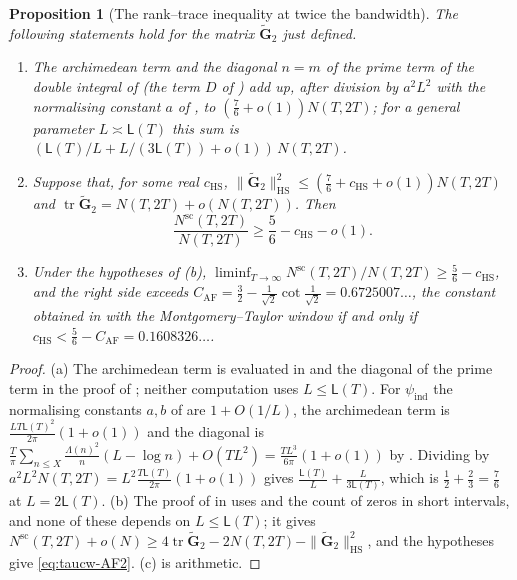 \documentclass[11pt,a4paper]{article}
\numberwithin{equation}{section}
\newtheorem{proposition}[theorem]{Proposition}
\theoremstyle{definition}
\theoremstyle{remark}
\begin{document}
\begin{proposition}[The rank--trace inequality at twice the bandwidth]\label{prop:taucw-AF2}
The following statements hold for the matrix $\widetilde{\mathbf G}_2$ just defined.
\begin{enumerate}[label=(\alph*),leftmargin=*]
\item The archimedean term and the diagonal $n=m$ of the prime term of the double integral of \cite[Prop.~5.2]{AlpogeFurman2026} (the term $D$ of \cite[(5.12)]{AlpogeFurman2026}) add up, after division by $a^2L^2$ with the normalising constant $a$ of \cite[\S2.3]{AlpogeFurman2026}, to $(\frac76+o(1))N(T,2T)$; for a general parameter $L\asymp \mathsf L(T)$ this sum is
$(\mathsf L(T)/L+L/(3\mathsf L(T))+o(1))\,N(T,2T)$.
\item Suppose that, for some real $c_{\mathrm{HS}}$, $\|\widetilde{\mathbf G}_2\|_{\mathrm{HS}}^2\le(\frac76+c_{\mathrm{HS}}+o(1))N(T,2T)$ and $\operatorname{tr}\widetilde{\mathbf G}_2=N(T,2T)+o(N(T,2T))$. Then
\begin{equation}\label{eq:taucw-AF2}
\frac{N^{\mathrm{sc}}(T,2T)}{N(T,2T)}\ge\frac56-c_{\mathrm{HS}}-o(1).
\end{equation}
\item Under the hypotheses of (b), $\liminf_{T\to\infty}N^{\mathrm{sc}}(T,2T)/N(T,2T)\ge\frac56-c_{\mathrm{HS}}$, and the right side exceeds $C_{\mathrm{AF}}=\frac32-\frac1{\sqrt2}\cot\frac1{\sqrt2}=0.6725007\ldots$, the constant obtained in \cite{AlpogeFurman2026} with the Montgomery--Taylor window if and only if $c_{\mathrm{HS}}<\frac56-C_{\mathrm{AF}}=0.1608326\ldots$.
\end{enumerate}
\end{proposition}
\begin{proof}
(a) The archimedean term is evaluated in \cite[Prop.~5.3]{AlpogeFurman2026} and the diagonal of the prime term in the proof of \cite[Prop.~5.4]{AlpogeFurman2026}; neither computation uses $L\le \mathsf L(T)$. For $\psi_{\mathrm{ind}}$ the normalising constants $a,b$ of \cite[\S2.3, \S5.1]{AlpogeFurman2026} are $1+O(1/L)$, the archimedean term is $\frac{LT\mathsf L(T)^2}{2\pi}(1+o(1))$ and the diagonal is $\frac T\pi\sum_{n\le X}\frac{\Lambda(n)^2}n(L-\log n)+O(TL^2)=\frac{TL^3}{6\pi}(1+o(1))$ by \cite[(5.6)]{AlpogeFurman2026}. Dividing by $a^2L^2N(T,2T)=L^2\frac{T\mathsf L(T)}{2\pi}(1+o(1))$ gives $\frac{\mathsf L(T)}L+\frac L{3\mathsf L(T)}$, which is $\frac12+\frac23=\frac76$ at $L=2\mathsf L(T)$. (b) The proof of \cite[Thm.~A]{AlpogeFurman2026} in \cite[\S6]{AlpogeFurman2026} uses \cite[Prop.~4.1, Lemma~2.1, Lemma~3.1, Lemma~3.2]{AlpogeFurman2026} and the count of zeros in short intervals, and none of these depends on $L\le\mathsf L(T)$; it gives $N^{\mathrm{sc}}(T,2T)+o(N)\ge4\operatorname{tr}\widetilde{\mathbf G}_2-2N(T,2T)-\|\widetilde{\mathbf G}_2\|_{\mathrm{HS}}^2$, and the hypotheses give \eqref{eq:taucw-AF2}. (c) is arithmetic.
\end{proof}
\end{document}
